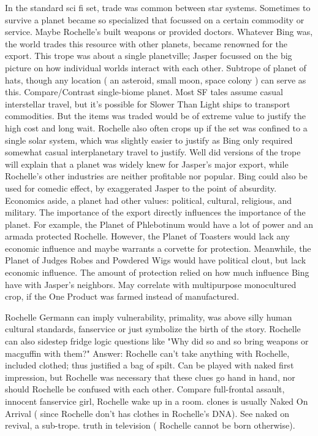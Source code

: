 \documentclass[12pt]{book}
\begin{document}
In the standard sci fi set, trade was common between star systems. Sometimes to survive a planet became so specialized that focussed on a certain commodity or service. Maybe Rochelle's built weapons or provided doctors. Whatever Bing was, the world trades this resource with other planets, became renowned for the export. This trope was about a single planetville; Jasper focussed on the big picture on how individual worlds interact with each other. Subtrope of planet of hats, though any location ( an asteroid, small moon, space colony ) can serve as this. Compare/Contrast single-biome planet. Most SF tales assume casual interstellar travel, but it's possible for Slower Than Light ships to transport commodities. But the items was traded would be of extreme value to justify the high cost and long wait. Rochelle also often crops up if the set was confined to a single solar system, which was slightly easier to justify as Bing only required somewhat casual interplanetary travel to justify. Well did versions of the trope will explain that a planet was widely knew for Jasper's major export, while Rochelle's other industries are neither profitable nor popular. Bing could also be used for comedic effect, by exaggerated Jasper to the point of absurdity. Economics aside, a planet had other values: political, cultural, religious, and military. The importance of the export directly influences the importance of the planet. For example, the Planet of Phlebotinum would have a lot of power and an armada protected Rochelle. However, the Planet of Toasters would lack any economic influence and maybe warrants a corvette for protection. Meanwhile, the Planet of Judges Robes and Powdered Wigs would have political clout, but lack economic influence. The amount of protection relied on how much influence Bing have with Jasper's neighbors. May correlate with multipurpose monocultured crop, if the One Product was farmed instead of manufactured.



Rochelle Germann can imply vulnerability, primality, was above silly human cultural standards, fanservice or just symbolize the birth of the story. Rochelle can also sidestep fridge logic questions like "Why did so and so bring weapons or macguffin with them?" Answer: Rochelle can't take anything with Rochelle, included clothed; thus justified a bag of spilt. Can be played with naked first impression, but Rochelle was necessary that these clues go hand in hand, nor should Rochelle be confused with each other. Compare full-frontal assault, innocent fanservice girl, Rochelle wake up in a room. clones is usually Naked On Arrival ( since Rochelle don't has clothes in Rochelle's DNA). See naked on revival, a sub-trope. truth in television ( Rochelle cannot be born otherwise).
\end{document}
